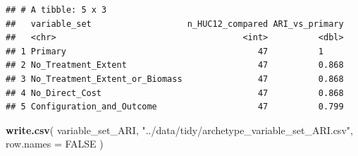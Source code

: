 \documentclass[
]{article}
\newenvironment{Shaded}{\begin{snugshade}}{\end{snugshade}}
\newcommand{\AttributeTok}[1]{\textcolor[rgb]{0.13,0.29,0.53}{#1}}
\newcommand{\ConstantTok}[1]{\textcolor[rgb]{0.56,0.35,0.01}{#1}}
\newcommand{\FunctionTok}[1]{\textcolor[rgb]{0.13,0.29,0.53}{\textbf{#1}}}
\newcommand{\NormalTok}[1]{#1}
\newcommand{\SpecialCharTok}[1]{\textcolor[rgb]{0.81,0.36,0.00}{\textbf{#1}}}
\newcommand{\StringTok}[1]{\textcolor[rgb]{0.31,0.60,0.02}{#1}}
\begin{document}
\begin{Shaded}
\end{Shaded}

\begin{verbatim}
## # A tibble: 5 x 3
##   variable_set                   n_HUC12_compared ARI_vs_primary
##   <chr>                                     <int>          <dbl>
## 1 Primary                                      47          1    
## 2 No_Treatment_Extent                          47          0.868
## 3 No_Treatment_Extent_or_Biomass               47          0.868
## 4 No_Direct_Cost                               47          0.868
## 5 Configuration_and_Outcome                    47          0.799
\end{verbatim}

\begin{Shaded}
\begin{Highlighting}[]
\FunctionTok{write.csv}\NormalTok{(}
\NormalTok{  variable\_set\_ARI,}
  \StringTok{"../data/tidy/archetype\_variable\_set\_ARI.csv"}\NormalTok{,}
  \AttributeTok{row.names =} \ConstantTok{FALSE}
\NormalTok{)}
\end{Highlighting}
\end{Shaded}
\end{document}
